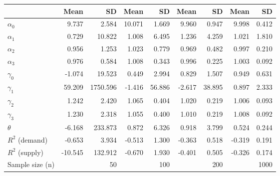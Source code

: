 
\begin{tabular}[t]{lrrrrrrrr}
\toprule
  & Mean & SD & Mean  & SD  & Mean   & SD   & Mean    & SD   \\
\midrule
$\alpha_{0}$ & 9.737 & 2.584 & 10.071 & 1.669 & 9.960 & 0.947 & 9.998 & 0.412\\
$\alpha_{1}$ & 0.729 & 10.822 & 1.008 & 6.495 & 1.236 & 4.259 & 1.021 & 1.810\\
$\alpha_{2}$ & 0.956 & 1.253 & 1.023 & 0.779 & 0.969 & 0.482 & 0.997 & 0.210\\
$\alpha_{3}$ & 0.976 & 0.584 & 1.008 & 0.343 & 0.996 & 0.225 & 1.003 & 0.092\\
$\gamma_{0}$ & -1.074 & 19.523 & 0.449 & 2.994 & 0.829 & 1.507 & 0.949 & 0.631\\
$\gamma_{1}$ & 59.209 & 1750.596 & -1.416 & 56.886 & -2.617 & 38.895 & 0.897 & 2.333\\
$\gamma_{2}$ & 1.242 & 2.420 & 1.065 & 0.404 & 1.020 & 0.219 & 1.006 & 0.093\\
$\gamma_{3}$ & 1.230 & 2.318 & 1.055 & 0.400 & 1.010 & 0.219 & 1.008 & 0.092\\
$\theta$ & -6.168 & 233.873 & 0.872 & 6.326 & 0.918 & 3.799 & 0.524 & 0.244\\
$R^{2}$ (demand) & -0.653 & 3.934 & -0.513 & 1.300 & -0.363 & 0.518 & -0.319 & 0.191\\
$R^{2}$ (supply) & -10.545 & 132.912 & -0.670 & 1.930 & -0.401 & 0.505 & -0.326 & 0.174\\
Sample size (n) &  & 50 &  & 100 &  & 200 &  & 1000\\
\bottomrule
\end{tabular}
